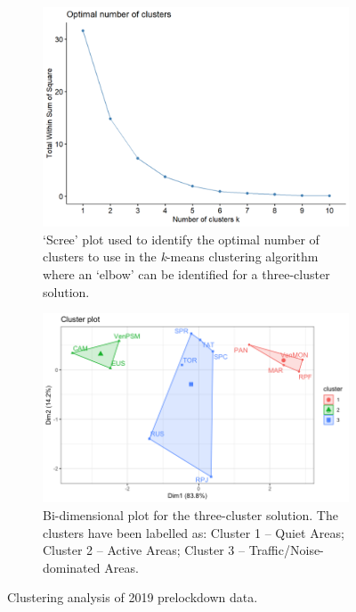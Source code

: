\begin{figure}[!h]
  \centering
  \begin{subfigure}{.75\textwidth}
    \centering
    \includegraphics{Figures/NoiseMappingLockdown Fig 6.png}
    \caption{`Scree' plot used to identify the optimal number of clusters to use in the \emph{k}-means clustering algorithm where an `elbow' can be identified for a three-cluster solution. \label{fig:NsMapLockScree}}
  \end{subfigure}
\hfill
  \begin{subfigure}{.75\textwidth}
    \centering
    \includegraphics[width=\textwidth]{Figures/LockdownClusterAnalysis1_2022-04-29.png}
    \caption{Bi-dimensional plot for the three-cluster solution. The clusters have been labelled as: Cluster 1 -- Quiet Areas; Cluster 2 -- Active Areas; Cluster 3 -- Traffic/Noise-dominated Areas. \label{fig:NsMapLockBiplot}}
  \end{subfigure}

\caption{Clustering analysis of 2019 prelockdown data.}

\end{figure}


